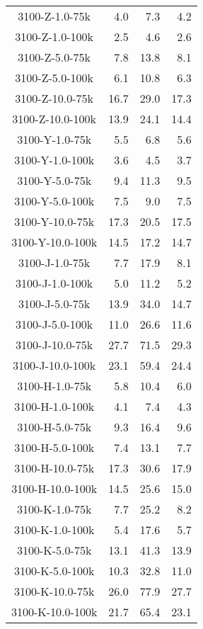 \begin{longtable}{crrr}
    3100-Z-1.0-75k &   4.0 &    7.3 &   4.2 \\
    3100-Z-1.0-100k &   2.5 &    4.6 &   2.6 \\
    3100-Z-5.0-75k &   7.8 &   13.8 &   8.1 \\
    3100-Z-5.0-100k &   6.1 &   10.8 &   6.3 \\
    3100-Z-10.0-75k &  16.7 &   29.0 &  17.3 \\
    3100-Z-10.0-100k &  13.9 &   24.1 &  14.4 \\
    3100-Y-1.0-75k &   5.5 &    6.8 &   5.6 \\
    3100-Y-1.0-100k &   3.6 &    4.5 &   3.7 \\
    3100-Y-5.0-75k &   9.4 &   11.3 &   9.5 \\
    3100-Y-5.0-100k &   7.5 &    9.0 &   7.5 \\
    3100-Y-10.0-75k &  17.3 &   20.5 &  17.5 \\
    3100-Y-10.0-100k &  14.5 &   17.2 &  14.7 \\
    3100-J-1.0-75k &   7.7 &   17.9 &   8.1 \\
    3100-J-1.0-100k &   5.0 &   11.2 &   5.2 \\
    3100-J-5.0-75k &  13.9 &   34.0 &  14.7 \\
    3100-J-5.0-100k &  11.0 &   26.6 &  11.6 \\
    3100-J-10.0-75k &  27.7 &   71.5 &  29.3 \\
    3100-J-10.0-100k &  23.1 &   59.4 &  24.4 \\
    3100-H-1.0-75k &   5.8 &   10.4 &   6.0 \\
    3100-H-1.0-100k &   4.1 &    7.4 &   4.3 \\
    3100-H-5.0-75k &   9.3 &   16.4 &   9.6 \\
    3100-H-5.0-100k &   7.4 &   13.1 &   7.7 \\
    3100-H-10.0-75k &  17.3 &   30.6 &  17.9 \\
    3100-H-10.0-100k &  14.5 &   25.6 &  15.0 \\
    3100-K-1.0-75k &   7.7 &   25.2 &   8.2 \\
    3100-K-1.0-100k &   5.4 &   17.6 &   5.7 \\
    3100-K-5.0-75k &  13.1 &   41.3 &  13.9 \\
    3100-K-5.0-100k &  10.3 &   32.8 &  11.0 \\
    3100-K-10.0-75k &  26.0 &   77.9 &  27.7 \\
    3100-K-10.0-100k &  21.7 &   65.4 &  23.1 \\

\end{longtable}
